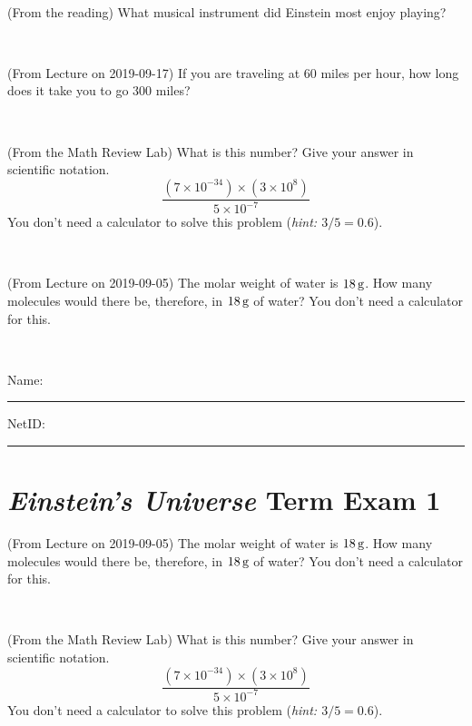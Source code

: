 \documentclass[12pt, letterpaper]{article}
\begin{document}
\vfill ~


\clearpage


\begin{problem} (From the reading)
What musical instrument did Einstein most enjoy playing?
\end{problem}


\vfill ~

\begin{problem} (From Lecture on 2019-09-17)
If you are traveling at 60 miles per hour, how long does
it take you to go 300 miles?
\end{problem}


\vfill ~

\begin{problem} (From the Math Review Lab)
What is this number? Give your answer in scientific notation.
$$
\frac{(7\times10^{-34})\times(3\times10^8)}{5\times10^{-7}}
$$
You don't need a calculator to solve this problem (\textit{hint: $3/5=0.6$}).
\end{problem}


\vfill ~

\begin{problem} (From Lecture on 2019-09-05)
The molar weight of water is $18\,\mathrm{g}$. How many molecules would there
be, therefore, in $18\,\mathrm{g}$ of water? You don't need a calculator for
this.
\end{problem}


\vfill ~


\cleardoublepage



\noindent
Name: \rule[-1ex]{0.60\textwidth}{0.1pt}
NetID: \rule[-1ex]{0.20\textwidth}{0.1pt}

\section*{\textsl{Einstein's Universe} Term Exam 1}
\setcounter{problem}{1}


\begin{problem} (From Lecture on 2019-09-05)
The molar weight of water is $18\,\mathrm{g}$. How many molecules would there
be, therefore, in $18\,\mathrm{g}$ of water? You don't need a calculator for
this.
\end{problem}


\vfill ~

\begin{problem} (From the Math Review Lab)
What is this number? Give your answer in scientific notation.
$$
\frac{(7\times10^{-34})\times(3\times10^8)}{5\times10^{-7}}
$$
You don't need a calculator to solve this problem (\textit{hint: $3/5=0.6$}).
\end{problem}
\end{document}
